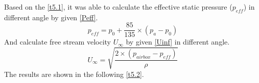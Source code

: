 Based on the \autoref{t5.1}, it was able to calculate the effective static pressure ($p_{eff}$) in different angle by given \autoref{Peff}.
\begin{equation}
    \label{Peff}
   p_{eff}=p_{0}+\frac{85}{135}\times(p_{a}-p_{0})
    \end{equation}
And calculate free stream velocity $U_\infty$ by given \autoref{Uinf} in different angle.
\begin{equation}
    \label{Uinf}
    U_{\infty}={\sqrt{\frac{2\times(p_{airbox}-p_{eff})}{\rho}}}
    \end{equation}
The results are shown in the following \autoref{t5.2}.
\begin{table}[htbp]
    \caption{$p_{eff}$ and $U_\infty$ in different angle(Unit: Pa and m/s)} 
	\label{t5.2}
    \end{table}

